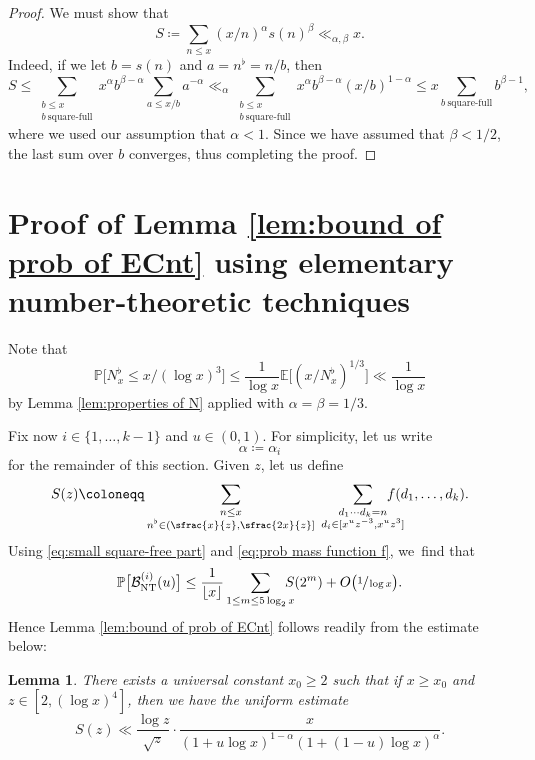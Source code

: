 \documentclass[10pt,a4paper]{article}
\newcommand{\PP}{\mathbb{P}}
\newcommand{\EE}{\mathbb{E}}
\newcommand{\floor}[1]{\left\lfloor #1 \right\rfloor}
\newcommand{\bg}{\big}
\newcommand{\Bnt}{\mathcal{B}_{\mathrm{NT}}}
\theoremstyle{plain}
\newtheorem{lem}[cor]{Lemma}
\theoremstyle{definition}
\begin{document}
\begin{proof} We must show that
\[
S\coloneqq \sum_{n \le x} (x/n)^\alpha s(n)^\beta\ll_{\alpha,\beta} x.
\]
Indeed, if we let $b=s(n)$ and $a=n^\flat=n/b$, then
\[
S\le \sum_{\substack{b\le x \\ b\ \text{square-full} }} x^\alpha b^{\beta-\alpha} \sum_{a\le x/b} a^{-\alpha}
\ll_\alpha \sum_{\substack{b\le x \\ b\ \text{square-full} }} x^\alpha b^{\beta-\alpha} (x/b)^{1-\alpha}
\le x \sum_{b\ \text{square-full} } b^{\beta-1},
\]
where we used our assumption that $\alpha<1$.
Since we have assumed that $\beta<1/2$, the last sum over $b$ converges, thus completing the proof.
\end{proof}

\section{Proof of Lemma \ref{lem:bound of prob of ECnt} using elementary number-theoretic techniques}\label{sec:boundary event NT}

Note that
\begin{equation}
\label{eq:small square-free part}
\PP\bg[N_x^\flat\le x/(\log x)^3\bg] \le \frac{1}{\log x} \EE\bg[(x/N_x^\flat)^{1/3}\bg] \ll \frac{1}{\log x}
\end{equation}
by Lemma \ref{lem:properties of N} applied with $\alpha=\beta=1/3$.

Fix now $i\in\{1,\dots,k-1\}$ and $u\in(0,1)$. For simplicity, let us write
\[
\alpha\coloneqq \alpha_i
\]
for the remainder of this section. Given $z$, let us define
\[
S(z)\coloneqq \sum_{\substack{n\le x \\ n^\flat \in(\sfrac{x}{z},\sfrac{2x}{z}]}}\; \sum_{\substack{d_1\cdots d_k = n \\ d_i\in[x^uz^{-3}, x^uz^3] }}\hspace*{-5mm} f(d_1,\dots,d_k).
\]
Using \eqref{eq:small square-free part} and \eqref{eq:prob mass function f}, we~find that
\begin{equation}
\label{eq:bounding Bnt 1}
\PP\bg[\Bnt^{(i)}(u)\bg] \le \frac{1}{\floor{x}} \sum_{1\le m\le 5\log_2x}\hspace*{-3mm} S(2^m) + O\bg(\sfrac{1}{\log x}\bg).
\end{equation}
Hence Lemma \ref{lem:bound of prob of ECnt} follows readily from the estimate below:

\begin{lem}
There exists a universal constant $x_0\ge2$ such that if $x\ge x_0$ and $z\in[2,(\log x)^4]$, then we have the uniform estimate
\[
S(z) \ll \frac{\log z}{\sqrt{z}} \cdot \frac{x}{(1+ u\log x)^{1-\alpha}(1+(1-u)\log x)^{\alpha}}.
\]
\end{lem}
\end{document}
